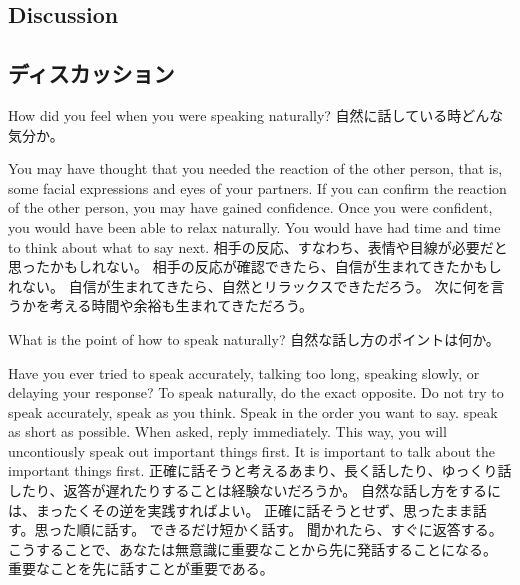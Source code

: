 \documentclass[uplatex,dvipdfmx,b5paper,english,10pt]{jsbook}
\begin{document}
\ifEnglish
\subsection{Discussion}
\else
\subsection{ディスカッション}
\fi

\begin{toiquestion}
\ifEnglish
How did you feel when you were speaking naturally?
\else
自然に話している時どんな気分か。
\fi
\end{toiquestion}
\begin{toianswer} %
\ifEnglish
You may have thought that you needed the reaction of the other person, that is, some facial expressions and eyes of your partners.
If you can confirm the reaction of the other person, you may have gained confidence.
Once you were confident, you would have been able to relax naturally.
You would have had time and time to think about what to say next.
\else
相手の反応、すなわち、表情や目線が必要だと思ったかもしれない。
相手の反応が確認できたら、自信が生まれてきたかもしれない。
自信が生まれてきたら、自然とリラックスできただろう。
次に何を言うかを考える時間や余裕も生まれてきただろう。
\fi
\end{toianswer}

\begin{toiquestion}
\ifEnglish
What is the point of how to speak naturally?
\else
自然な話し方のポイントは何か。
\fi
\end{toiquestion}
\begin{toianswer} %
\ifEnglish
Have you ever tried to speak accurately, talking too long, speaking slowly, or delaying your response?
To speak naturally, do the exact opposite.
Do not try to speak accurately, speak as you think. Speak in the order you want to say.
speak as short as possible.
When asked, reply immediately.
This way, you will uncontiously speak out important things first.
It is important to talk about the important things first.
\else
正確に話そうと考えるあまり、長く話したり、ゆっくり話したり、返答が遅れたりすることは経験ないだろうか。
自然な話し方をするには、まったくその逆を実践すればよい。
正確に話そうとせず、思ったまま話す。思った順に話す。
できるだけ短かく話す。
聞かれたら、すぐに返答する。
こうすることで、あなたは無意識に重要なことから先に発話することになる。
重要なことを先に話すことが重要である。
\fi
\end{toianswer}
\end{document}
